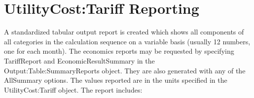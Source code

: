 \section{UtilityCost:Tariff Reporting}\label{utilitycosttariff-reporting}

A standardized tabular output report is created which shows all components of all categories in the calculation sequence on a variable basis (usually 12 numbers, one for each month). The economics reports may be requested by specifying TariffReport and  EconomicResultSummary in the Output:Table:SummaryReports object. They are also generated with any of the AllSummary options. The values reported are in the units specified in the UtilityCost:Tariff object. The report includes:
